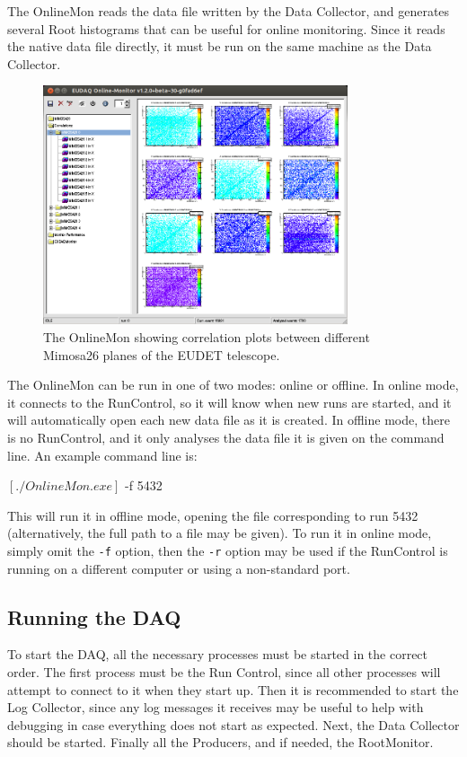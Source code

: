 The OnlineMon reads the data file written by the Data Collector,
and generates several Root histograms that can be useful for online monitoring.
Since it reads the native data file directly, it must be run on the
same machine as the Data Collector.

\begin{figure}[htb]
  \begin{center}
    \includegraphics[width=0.8\textwidth]{src/images/OnlineMonCorrelations}
    \caption{The OnlineMon showing correlation plots between different
      Mimosa26 planes of the EUDET telescope.}
    \label{fig:OnlineMonPlots}
  \end{center}
\end{figure}


The OnlineMon can be run in one of two modes: online or offline.
In online mode, it connects to the RunControl, so it will know when new runs are started,
and it will automatically open each new data file as it is created.
In offline mode, there is no RunControl,
and it only analyses the data file it is given on the command line. 
An example command line is:
\begin{listing}[mybash]
$[./OnlineMon.exe]$ -f 5432
\end{listing}

This will run it in offline mode, opening the file corresponding to run 5432
(alternatively, the full path to a file may be given).
To run it in online mode, simply omit the \texttt{-f} option,
then the \texttt{-r} option may be used if the RunControl
is running on a different computer or using a non-standard port.

\subsection{Running the DAQ}
To start the DAQ, all the necessary processes must be started in the correct order.
The first process must be the Run Control,
since all other processes will attempt to connect to it when they start up.
Then it is recommended to start the Log Collector,
since any log messages it receives may be useful
to help with debugging in case everything does not start as expected.
Next, the Data Collector should be started.
Finally all the Producers, and if needed, the RootMonitor.

